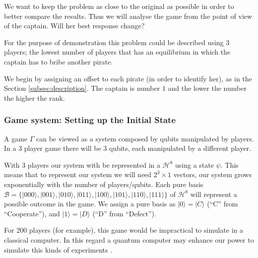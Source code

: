 We want to keep the problem as close to the original as possible in order to better compare the results. Thus we will analyse the game from the point of view of the captain. Will her best response change?

For the purpose of demonstration this problem could be described using $3$ players; the lowest number of players that has an equilibrium in which the captain has to bribe another pirate. 

We begin by assigning an offset to each pirate (in order to identify her), as in the Section \ref{subsec:description}. The captain is number $1$ and the lower the number the higher the rank. 



\subsubsection{Game system: Setting up the Initial State}
\label{subsec:pirates_initialstate}

A game $\Gamma$ can be viewed as a system composed by qubits manipulated by players. In a $3$ player game there will be $3$ qubits, each manipulated by a different player. 

With $3$ players our system with be represented in a $\mathcal{H}^{8}$ using a state $\psi$. This means that to represent our system we will need $2^{3}\times 1$ vectors, our system grows exponentially with the number of players/qubits. Each pure basis $\mathcal{B}= \{ \vert 000\rangle , \vert 001\rangle , \vert 010\rangle , \vert 011\rangle , \vert 100\rangle , \vert 101\rangle , \vert 110\rangle , \vert 111\rangle \}$ of $\mathcal{H}^{8}$ will represent a possible outcome in the game. We assign a pure basis as $\vert 0\rangle = \vert C\rangle$ (``C'' from ``Cooperate''), and $\vert 1\rangle = \vert D\rangle$ (``D'' from ``Defect'').

For 200 players (for example), this game would be impractical to simulate in a classical computer. In this regard a quantum computer may enhance our power to simulate this kinds of experiments \cite{Rieffel2011}.

